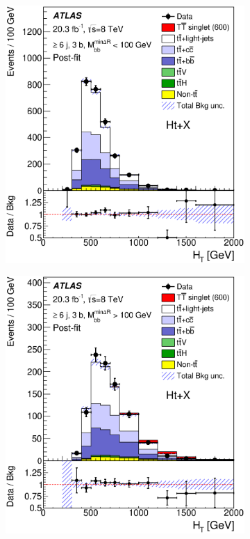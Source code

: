 \begin{figure}[!tp]
\begin{center}
  \begin{subfigure}{0.49\textwidth}
\includegraphics[width=\textwidth]{Analysis/Figures_HtX/HtXPaper/HtX/postfit_unblind/HTAll_6jetin3btagexOutHmv18TeV.eps}
\caption{}\end{subfigure}
  \begin{subfigure}{0.49\textwidth}
\includegraphics[width=\textwidth]{Analysis/Figures_HtX/HtXPaper/HtX/postfit_unblind/HTAll_6jetin3btagexInHmv18TeV.eps}

\end{subfigure}
\end{center}
\end{figure}
